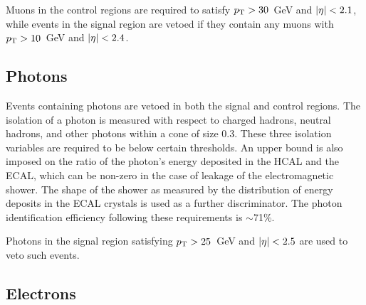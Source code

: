 Muons in the control regions are required to satisfy ${p_{\text T}}>30$~GeV and 
$|\eta|<2.1$, while events in the signal region are vetoed if they contain any 
muons with ${p_{\text T}}>10$~GeV and $|\eta|<2.4$. 

\subsection*{Photons}



Events containing photons are vetoed in both the signal and control regions. 
The isolation of a photon is measured with respect to charged 
hadrons, neutral hadrons, and other photons within a \detadphi cone of size 
$0.3$. These three isolation variables are required to be below certain 
thresholds. 
An upper bound is also imposed on the ratio of the photon's energy deposited in 
the HCAL and the ECAL, which can be non-zero in the case of leakage of the 
electromagnetic shower. The shape of the shower as measured by the distribution 
of energy deposits in the ECAL crystals is used as a further discriminator. 
The photon identification efficiency following these requirements is 
$\sim$71\%. 


Photons in the signal region satisfying ${p_{\text T}}>25$~GeV and $|\eta|<2.5$ are used 
to veto such events.

\subsection*{Electrons}

